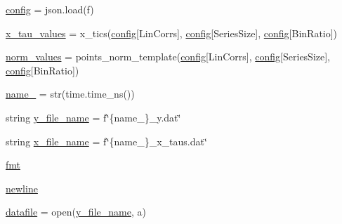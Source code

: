 \begin{DoxyCompactItemize}
\item 
\hyperlink{namespacepost__upload__actions_accb09cfbbad171dde59d37a322e7d426}{config} = json.\+load(f)
\item 
\hyperlink{namespacepost__upload__actions_adee53b372de24d69e9156b1df89e0611}{x\+\_\+tau\+\_\+values} = x\+\_\+tics(\hyperlink{namespacepost__upload__actions_accb09cfbbad171dde59d37a322e7d426}{config}\mbox{[}\textquotesingle{}Lin\+Corrs\textquotesingle{}\mbox{]}, \hyperlink{namespacepost__upload__actions_accb09cfbbad171dde59d37a322e7d426}{config}\mbox{[}\textquotesingle{}Series\+Size\textquotesingle{}\mbox{]}, \hyperlink{namespacepost__upload__actions_accb09cfbbad171dde59d37a322e7d426}{config}\mbox{[}\textquotesingle{}Bin\+Ratio\textquotesingle{}\mbox{]})
\item 
\hyperlink{namespacepost__upload__actions_a8ce1efa4da6c671aad5bd74a05d6491a}{norm\+\_\+values} = points\+\_\+norm\+\_\+template(\hyperlink{namespacepost__upload__actions_accb09cfbbad171dde59d37a322e7d426}{config}\mbox{[}\textquotesingle{}Lin\+Corrs\textquotesingle{}\mbox{]}, \hyperlink{namespacepost__upload__actions_accb09cfbbad171dde59d37a322e7d426}{config}\mbox{[}\textquotesingle{}Series\+Size\textquotesingle{}\mbox{]}, \hyperlink{namespacepost__upload__actions_accb09cfbbad171dde59d37a322e7d426}{config}\mbox{[}\textquotesingle{}Bin\+Ratio\textquotesingle{}\mbox{]})
\item 
\hyperlink{namespacepost__upload__actions_ab550bd3db3e82b8d71d3f5962bdf3b01}{name\+\_\+} = str(time.\+time\+\_\+ns())
\item 
string \hyperlink{namespacepost__upload__actions_a9989a70c849a81f874a7499fe566446c}{y\+\_\+file\+\_\+name} = f\char`\"{}\{name\+\_\+\}\+\_\+y.\+dat\char`\"{}
\item 
string \hyperlink{namespacepost__upload__actions_a69a8dece1cead975550839950d39ac2c}{x\+\_\+file\+\_\+name} = f\char`\"{}\{name\+\_\+\}\+\_\+x\+\_\+taus.\+dat\char`\"{}
\item 
\hyperlink{namespacepost__upload__actions_afffee9403d0b5fc3e9dab1f30f771e0e}{fmt}
\item 
\hyperlink{namespacepost__upload__actions_afb35f51de2003a038c02100770ee1ab9}{newline}
\item 
\hyperlink{namespacepost__upload__actions_a007e73e512c986469933678ddb96bf21}{datafile} = open(\hyperlink{namespacepost__upload__actions_a9989a70c849a81f874a7499fe566446c}{y\+\_\+file\+\_\+name}, \textquotesingle{}a\textquotesingle{})
\item 

\end{DoxyCompactItemize}
